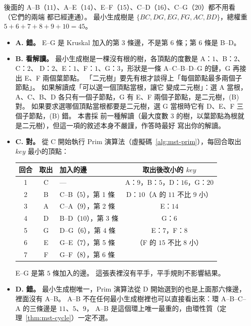 後面的 A--B（$11$）、A--E（$14$）、E--F（$15$）、C--D（$16$）、C--G（$20$）都不用看（它們的兩端
都已經連通）。 最小生成樹是 $\{BC, DG, EG, FG, AC, BD\}$，總權重 $5 + 6 + 7 + 8 + 9 + 10 = 45$。

\begin{itemize}
\item \textbf{A. 錯。} E--G 是 Kruskal 加入的第 $3$ 條邊，不是第 $6$ 條；第 $6$ 條是 B--D。
\item \textbf{B. 看解讀。} 最小生成樹是一棵沒有根的樹，各頂點的度數是 A：$1$、B：$2$、C：$2$、
D：$2$、E：$1$、F：$1$、G：$3$，形狀是一條 A--C--B--D--G 的鏈，G 再接出 E、F 兩個葉節點。
「二元樹」要先有根才談得上「每個節點最多兩個子節點」。 如果解讀成「可以選一個頂點當根，讓它
變成二元樹」：選 A 當根，A、C、B、D 各只有一個子節點，G 有 E、F 兩個子節點，是二元樹，(B)
對。 如果要求選哪個頂點當根都要是二元樹，選 G 當根時它有 D、E、F 三個子節點，(B) 錯。 本書採
前一種解讀（最大度數 $3$ 的樹，以葉節點為根就是二元樹），但這一項的敘述本身不嚴謹，作答時最好
寫出你的解讀。
\item \textbf{C. 對。} 從 C 開始執行 Prim 演算法（虛擬碼~\ref{alg:mst-prim}），每回合取出
$\mathit{key}$ 最小的頂點：

\begin{center}
\small
\begin{tabular}{cclc}
\toprule
回合 & 取出 & 加入的邊 & 取出後改小的 $\mathit{key}$ \\
\midrule
1 & C & — & A：$9$，B：$5$，D：$16$，G：$20$ \\
2 & B & C--B（$5$），第 1 條 & D：$10$（A 的 $11$ 不比 $9$ 小） \\
3 & A & C--A（$9$），第 2 條 & E：$14$ \\
4 & D & B--D（$10$），第 3 條 & G：$6$ \\
5 & G & D--G（$6$），第 4 條 & E：$7$，F：$8$ \\
6 & E & G--E（$7$），第 5 條 & （F 的 $15$ 不比 $8$ 小） \\
7 & F & G--F（$8$），第 6 條 & \\
\bottomrule
\end{tabular}
\end{center}

E--G 是第 $5$ 條加入的邊。 這張表裡沒有平手，平手規則不影響結果。
\item \textbf{D. 錯。} 最小生成樹唯一，Prim 演算法從 D 開始選到的也是上面那六條邊，裡面沒有
A--B。 A--B 不在任何最小生成樹裡也可以直接看出來：環 A--B--C--A 的三條邊是 $11$、$5$、$9$，
A--B 是這個環上唯一最重的，由環性質（定理~\ref{thm:mst-cycle}）一定不選。
\end{itemize}

